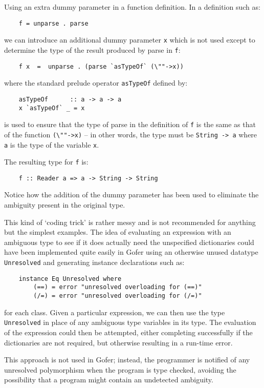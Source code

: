 \IT  Using an extra dummy parameter in a  function  definition.   In  a
     definition such as:
\begin{verbatim}
    f = unparse . parse
\end{verbatim}
     we can introduce an additional dummy parameter \verb"x"  which  is  not
     used except to determine the type of the result produced by  parse
     in \verb"f":
\begin{verbatim}
    f x  =  unparse . (parse `asTypeOf` (\""->x))
\end{verbatim}
     where the standard prelude operator \verb"asTypeOf" defined by:
\begin{verbatim}
    asTypeOf      :: a -> a -> a
    x `asTypeOf` _ = x
\end{verbatim}
     is used to ensure that the type of parse in the definition of \verb"f" is
     the same as that of the function \verb'(\""->x)' -- in other  words,  the
     type must be \verb"String -> a" where 
     \verb"a" is the type of the variable \verb"x".

     The resulting type for \verb"f" is:
\begin{verbatim}
    f :: Reader a => a -> String -> String
\end{verbatim}
     Notice how the addition of the dummy parameter has  been  used  to
     eliminate the ambiguity present in the original type.

     This kind of `coding trick' is rather messy and is not recommended
     for anything but the simplest examples.
\EI
The idea of evaluating an expression with an ambiguous type  to
see if it does actually need the unspecified  dictionaries  could  have
been implemented quite easily in Gofer using an otherwise unused
datatype \verb"Unresolved" and generating instance declarations such as:
\begin{verbatim}
    instance Eq Unresolved where
        (==) = error "unresolved overloading for (==)"
        (/=) = error "unresolved overloading for (/=)"
\end{verbatim}
for each class.  Given a particular expression, we  can  then  use  the
type \verb"Unresolved" 
in place of any ambiguous type variables in its type.   The
evaluation of the expression could then be attempted, either completing
successfully if  the  dictionaries  are  not  required,  but  otherwise
resulting in a run-time error.

This approach is not used in Gofer; instead, the programmer is notified
of any unresolved  polymorphism  when  the  program  is  type  checked,
avoiding the possibility that a program  might  contain  an  undetected
ambiguity.


